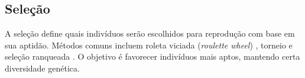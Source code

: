\subsection{Seleção}

A seleção define quais indivíduos serão escolhidos para reprodução com base em sua aptidão. Métodos comuns incluem roleta viciada (\textit{roulette wheel}) \cite{goldberg1989genetic}, torneio \cite{miller1995genetic} e seleção ranqueada \cite{goldberg1989genetic}. O objetivo é favorecer indivíduos mais aptos, mantendo certa diversidade genética.




